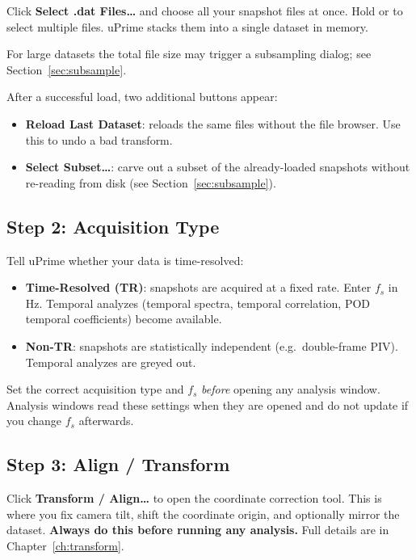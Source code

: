 \documentclass[11pt, a4paper]{report}
\newcommand{\uipth}[1]{\textbf{\textcolor{upblue}{#1}}}
\newcommand{\key}[1]{\fbox{\small\texttt{#1}}}
\begin{document}
Click \uipth{Select .dat Files\ldots} and choose all your snapshot files at once. Hold \key{Ctrl} or \key{Shift} to select multiple files. uPrime stacks them into a single dataset in memory.

For large datasets the total file size may trigger a subsampling dialog; see Section~\ref{sec:subsample}.

After a successful load, two additional buttons appear:

\begin{itemize}[leftmargin=1.5em]
  \item \uipth{Reload Last Dataset}: reloads the same files without the file browser. Use this to undo a bad transform.
  \item \uipth{Select Subset\ldots}: carve out a subset of the already-loaded snapshots without re-reading from disk (see Section~\ref{sec:subsample}).
\end{itemize}

\subsection{Step 2: Acquisition Type}

Tell uPrime whether your data is time-resolved:

\begin{itemize}[leftmargin=1.5em]
  \item \uipth{Time-Resolved (TR)}: snapshots are acquired at a fixed rate. Enter $f_s$ in Hz. Temporal analyzes (temporal spectra, temporal correlation, POD temporal coefficients) become available.
  \item \uipth{Non-TR}: snapshots are statistically independent (e.g.\ double-frame PIV). Temporal analyzes are greyed out.
\end{itemize}

\begin{warnbox}
Set the correct acquisition type and $f_s$ \emph{before} opening any analysis window. Analysis windows read these settings when they are opened and do not update if you change $f_s$ afterwards.
\end{warnbox}

\subsection{Step 3: Align / Transform}

Click \uipth{Transform / Align\ldots} to open the coordinate correction tool. This is where you fix camera tilt, shift the coordinate origin, and optionally mirror the dataset. \textbf{Always do this before running any analysis.} Full details are in Chapter~\ref{ch:transform}.
\end{document}
